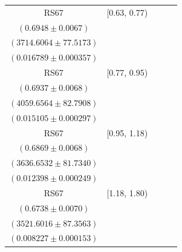 {\begin{longtable}{|c|c|c|c|c|}
RS67 & [0.63, 0.77) & \begin{tabular}{@{}c@{}}$0.7477 \pm 0.0043$ \\ $(0.6948 \pm 0.0067)$\end{tabular} & \begin{tabular}{@{}c@{}}$3391.7117 \pm 71.2736$ \\ $(3714.6064 \pm 77.5173)$\end{tabular} & \begin{tabular}{@{}c@{}}$0.015920 \pm 0.000348$ \\ $(0.016789 \pm 0.000357)$\end{tabular} \\ \hline
RS67 & [0.77, 0.95) & \begin{tabular}{@{}c@{}}$0.7448 \pm 0.0044$ \\ $(0.6937 \pm 0.0068)$\end{tabular} & \begin{tabular}{@{}c@{}}$3700.2820 \pm 76.2584$ \\ $(4059.6564 \pm 82.7908)$\end{tabular} & \begin{tabular}{@{}c@{}}$0.014951 \pm 0.000296$ \\ $(0.015105 \pm 0.000297)$\end{tabular} \\ \hline
RS67 & [0.95, 1.18) & \begin{tabular}{@{}c@{}}$0.7364 \pm 0.0046$ \\ $(0.6869 \pm 0.0068)$\end{tabular} & \begin{tabular}{@{}c@{}}$3320.0846 \pm 75.4220$ \\ $(3636.6532 \pm 81.7340)$\end{tabular} & \begin{tabular}{@{}c@{}}$0.012885 \pm 0.000254$ \\ $(0.012398 \pm 0.000249)$\end{tabular} \\ \hline
RS67 & [1.18, 1.80) & \begin{tabular}{@{}c@{}}$0.7203 \pm 0.0050$ \\ $(0.6738 \pm 0.0070)$\end{tabular} & \begin{tabular}{@{}c@{}}$3240.1092 \pm 81.0655$ \\ $(3521.6016 \pm 87.3563)$\end{tabular} & \begin{tabular}{@{}c@{}}$0.008912 \pm 0.000159$ \\ $(0.008227 \pm 0.000153)$\end{tabular} \\ \hline
\end{longtable}
}
